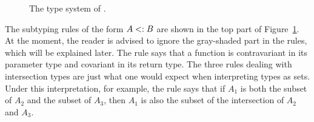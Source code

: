 \begin{figure}



  \caption{The type system of \name.}
  \label{fig:fi-type}
\end{figure}




The subtyping rules of the form $A <: B$ are shown in the top part of
Figure~\ref{fig:fi-type}. At the moment, the reader is advised to ignore the
gray-shaded part in the rules, which will be explained later. The rule
 says that a function is contravariant in its parameter
type and covariant in its return type. The three rules dealing with
intersection types are just what one would expect when interpreting types as
sets. Under this interpretation, for example, the rule 
says that if $A_1$ is both the subset of $A_2$ and the subset of $A_3$, then
$A_1$ is also the subset of the intersection of $A_2$ and $A_3$.


